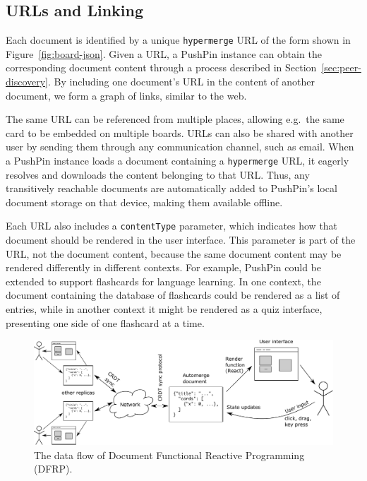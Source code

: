 \documentclass[sigplan,10pt]{acmart}
\begin{document}
\subsection{URLs and Linking}\label{sec:urls}

Each document is identified by a unique \texttt{hypermerge} URL of the form shown in Figure~\ref{fig:board-json}.
Given a URL, a PushPin instance can obtain the corresponding document content through a process described in Section~\ref{sec:peer-discovery}.
By including one document's URL in the content of another document, we form a graph of links, similar to the web.

The same URL can be referenced from multiple places, allowing e.g.\ the same card to be embedded on multiple boards.
URLs can also be shared with another user by sending them through any communication channel, such as email.
When a PushPin instance loads a document containing a \texttt{hypermerge} URL, it eagerly resolves and downloads the content belonging to that URL.
Thus, any transitively reachable documents are automatically added to PushPin's local document storage on that device, making them available offline.

Each URL also includes a \texttt{contentType} parameter, which indicates how that document should be rendered in the user interface.
This parameter is part of the URL, not the document content, because the same document content may be rendered differently in different contexts.
For example, PushPin could be extended to support flashcards for language learning.
In one context, the document containing the database of flashcards could be rendered as a list of entries, while in another context it might be rendered as a quiz interface, presenting one side of one flashcard at a time.

\begin{figure}
\centering
\includegraphics{document-frp.pdf}
\caption{The data flow of Document Functional Reactive Programming (DFRP).}
\label{fig:document-frp}
\end{figure}
\end{document}
